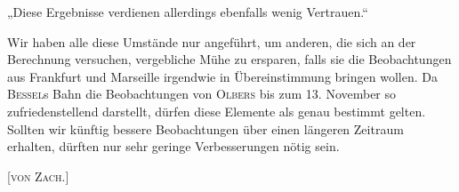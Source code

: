 „Diese Ergebnisse verdienen allerdings ebenfalls wenig Vertrauen.“
\par\indent Wir haben alle diese Umstände nur angeführt, um anderen, die sich an der Berechnung versuchen, vergebliche Mühe zu ersparen, falls sie die Beobachtungen aus Frankfurt und Marseille irgendwie in Übereinstimmung bringen wollen. Da \textsc{Bessel}s Bahn die Beobachtungen von \textsc{Olbers} bis zum 13. November so zufriedenstellend darstellt, dürfen diese Elemente als genau bestimmt gelten. Sollten wir künftig bessere Beobachtungen über einen längeren Zeitraum erhalten, dürften nur sehr geringe Verbesserungen nötig sein.

\hfill[\textsc{von Zach.}]

